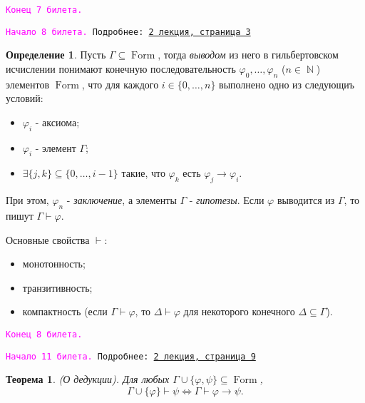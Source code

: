 \documentclass[a4paper,100pt]{article}
\theoremstyle{indented}
\newtheorem{theorem}{Теорема}
\theoremstyle{definition}
\newtheorem{defn}{Определение}
\theoremstyle{remark}
\DeclareMathOperator{\NN}{\mathbb{N}}
\DeclareMathOperator{\form}{Form}
\begin{document}
\texttt{\textcolor{magenta}{Конец 7 билета.}} 

\hrulefill

\texttt{\hypertarget{b8}{\textcolor{magenta}{Начало 8 билета.}} Подробнее: \href{http://www.mi-ras.ru/~speranski/courses/logic-1-2021-spring/slides_2.pdf}{2 лекция, страница 3}} 

\begin{defn}
  Пусть $\Gamma \subseteq \form$, тогда \textit{выводом} из него в гильбертовском исчислении понимают конечную последовательность $\varphi_0, \ldots, \varphi_n$ ($n\in \NN$) элементов $\form$, что для каждого $i\in\{0, \ldots, n\}$ выполнено одно из следующиъ условий: 

  \begin{itemize}
    \item $\varphi_i$ - аксиома; 
    \item $\varphi_i$ - элемент $\Gamma$; 
    \item $\exists \{j, k\}\subseteq\{0, \ldots, i-1\}$ такие, что $\varphi_k$ есть $\varphi_j\rightarrow \varphi_i$. 
  \end{itemize}
  При этом, $\varphi_n$ - \textit{заключение}, а элементы $\Gamma$ - \textit{гипотезы}. Если $\varphi$ выводится из $\Gamma$, то пишут $\Gamma \vdash \varphi$. 
\end{defn}

Основные свойства $\vdash$:

\begin{itemize}
  \item монотонность; 
  \item транзитивность;
  \item компактность (если $\Gamma \vdash \varphi$, то $\Delta \vdash \varphi$ для некоторого конечного $\Delta \subseteq \Gamma$).
\end{itemize}

\texttt{\textcolor{magenta}{Конец 8 билета.}} 

\hrulefill

\texttt{\hypertarget{b11}{\textcolor{magenta}{Начало 11 билета.}} Подробнее: \href{http://www.mi-ras.ru/~speranski/courses/logic-1-2021-spring/slides_2.pdf}{2 лекция, страница 9}} \\

\begin{theorem}
  (О дедукции). Для любых $\Gamma \cup \{\varphi, \psi\}\subseteq \form$, 
  \[
    \Gamma \cup \{\varphi\}\vdash \psi \Longleftrightarrow \Gamma \vdash \varphi \rightarrow \psi. 
  \]
\end{theorem}
\end{document}
